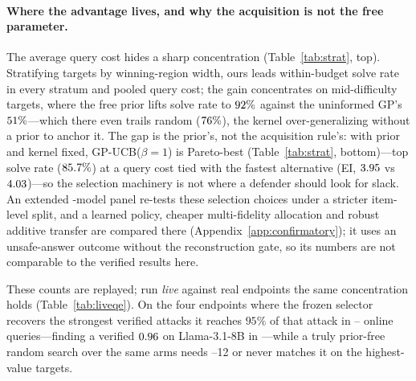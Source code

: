 \documentclass{article}
\begin{document}
\paragraph{Where the advantage lives, and why the acquisition is not the free parameter.} The average query cost hides a sharp concentration (Table~\ref{tab:strat}, top). Stratifying targets by winning-region width, ours leads within-budget solve rate in every stratum and pooled query cost; the gain concentrates on mid-difficulty targets, where the free prior lifts solve rate to $92\%$ against the uninformed GP's $51\%$---which there even trails random ($76\%$), the kernel over-generalizing without a prior to anchor it. The gap is the prior's, not the acquisition rule's: with prior and kernel fixed, GP-UCB($\beta{=}1$) is Pareto-best (Table~\ref{tab:strat}, bottom)---top solve rate ($85.7\%$) at a query cost tied with the fastest alternative (EI, $3.95$ vs $4.03$)---so the selection machinery is not where a defender should look for slack. An extended \pjcfModels{}-model panel re-tests these selection choices under a stricter item-level split, and a learned policy, cheaper multi-fidelity allocation and robust additive transfer are compared there (Appendix~\ref{app:confirmatory}); it uses an unsafe-answer outcome without the reconstruction gate, so its numbers are not comparable to the verified results here.

These counts are replayed; run \emph{live} against real endpoints the same concentration holds (Table~\ref{tab:liveqe}). On the four endpoints where the frozen selector recovers the strongest verified attacks it reaches $95\%$ of that attack in \pjlqOursLo{}--\pjlqOursHi{} online queries---finding a verified $0.96$ on Llama-3.1-8B in \pjlqLEours{}---while a truly prior-free random search over the same arms needs \pjlqRandLo{}--12 or never matches it on the highest-value targets.
\end{document}

